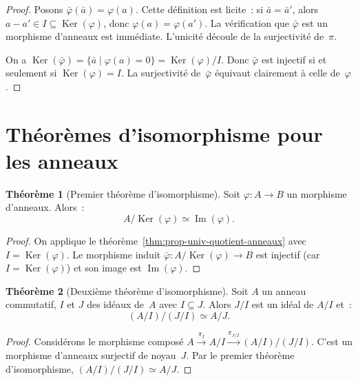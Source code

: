 \documentclass[12pt,a4paper,openany]{book}
\theoremstyle{definition}
\newtheorem{theoreme}{Théorème}[chapter]
\DeclareMathOperator{\Ker}{Ker}
\renewcommand{\Im}{\operatorname{Im}}
\begin{document}
\begin{proof}
Posons $\bar{\varphi}(\bar{a}) = \varphi(a)$. Cette définition est
licite~: si $\bar{a} = \bar{a}'$, alors $a - a' \in I \subseteq
\Ker(\varphi)$, donc $\varphi(a) = \varphi(a')$. La vérification que
$\bar{\varphi}$ est un morphisme d'anneaux est immédiate. L'unicité
découle de la surjectivité de~$\pi$.

On a $\Ker(\bar{\varphi}) = \{\bar{a} \mid \varphi(a) = 0\}
= \Ker(\varphi)/I$. Donc $\bar{\varphi}$ est injectif si et seulement si
$\Ker(\varphi) = I$. La surjectivité de~$\bar{\varphi}$ équivaut
clairement à celle de~$\varphi$.
\end{proof}

\section{Théorèmes d'isomorphisme pour les anneaux}%
\label{sec:iso-anneaux}

\begin{theoreme}[Premier théorème d'isomorphisme]%
\label{thm:premier-iso-anneaux}
Soit $\varphi \colon A \to B$ un morphisme d'anneaux. Alors~:
\[
  A / \Ker(\varphi) \simeq \Im(\varphi).
\]
\end{theoreme}

\begin{proof}
On applique le théorème~\ref{thm:prop-univ-quotient-anneaux} avec
$I = \Ker(\varphi)$. Le morphisme induit
$\bar{\varphi} \colon A/\Ker(\varphi) \to B$ est injectif (car
$I = \Ker(\varphi)$) et son image est $\Im(\varphi)$.
\end{proof}

\begin{theoreme}[Deuxième théorème d'isomorphisme]%
\label{thm:deuxieme-iso-anneaux}
Soit $A$ un anneau commutatif, $I$ et $J$ des idéaux de~$A$ avec
$I \subseteq J$. Alors $J/I$ est un idéal de $A/I$ et~:
\[
  (A/I)\big/(J/I) \simeq A/J.
\]
\end{theoreme}

\begin{proof}
Considérons le morphisme composé $A \xrightarrow{\pi_I} A/I
\xrightarrow{\pi_{J/I}} (A/I)/(J/I)$. C'est un morphisme d'anneaux
surjectif de noyau~$J$. Par le premier théorème d'isomorphisme,
$(A/I)/(J/I) \simeq A/J$.
\end{proof}
\end{document}
